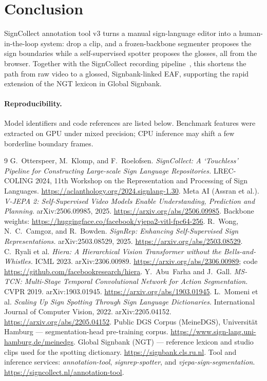 \documentclass[11pt]{article}
\begin{document}
\section{Conclusion}
SignCollect annotation tool v3 turns a manual sign-language editor into a human-in-the-loop
system: drop a clip, and a frozen-backbone segmenter proposes the sign boundaries while a
self-supervised spotter proposes the glosses, all from the browser. Together with the SignCollect
recording pipeline~\cite{signcollect}, this shortens the path from raw video to a glossed,
Signbank-linked EAF, supporting the rapid extension of the NGT lexicon in Global Signbank.

\paragraph{Reproducibility.} Model identifiers and code references are listed below. Benchmark
features were extracted on GPU under mixed precision; CPU inference may shift a few borderline
boundary frames.

\begin{thebibliography}{9}
 G.~Otterspeer, M.~Klomp, and F.~Roelofsen.
  \emph{SignCollect: A `Touchless' Pipeline for Constructing Large-scale Sign Language
  Repositories.} LREC-COLING 2024, 11th Workshop on the Representation and Processing of Sign
  Languages. \url{https://aclanthology.org/2024.signlang-1.30}.
 Meta AI (Assran et al.). \emph{V-JEPA 2: Self-Supervised Video Models Enable
  Understanding, Prediction and Planning.} arXiv:2506.09985, 2025.
  \url{https://arxiv.org/abs/2506.09985}. Backbone weights:
  \url{https://huggingface.co/facebook/vjepa2-vitl-fpc64-256}.
 R.~Wong, N.~C.~Camgoz, and R.~Bowden. \emph{SignRep: Enhancing Self-Supervised
  Sign Representations.} arXiv:2503.08529, 2025. \url{https://arxiv.org/abs/2503.08529}.
 C.~Ryali et al. \emph{Hiera: A Hierarchical Vision Transformer without the
  Bells-and-Whistles.} ICML 2023. arXiv:2306.00989. \url{https://arxiv.org/abs/2306.00989};
  code \url{https://github.com/facebookresearch/hiera}.
 Y.~Abu~Farha and J.~Gall. \emph{MS-TCN: Multi-Stage Temporal Convolutional
  Network for Action Segmentation.} CVPR 2019. arXiv:1903.01945.
  \url{https://arxiv.org/abs/1903.01945}.
 L.~Momeni et al. \emph{Scaling Up Sign Spotting Through Sign Language
  Dictionaries.} International Journal of Computer Vision, 2022. arXiv:2205.04152.
  \url{https://arxiv.org/abs/2205.04152}.
 Public DGS Corpus (MeineDGS), Universit\"at Hamburg --- segmentation-head
  pre-training corpus. \url{https://www.sign-lang.uni-hamburg.de/meinedgs}.
 Global Signbank (NGT) --- reference lexicon and studio clips used for the
  spotting dictionary. \url{https://signbank.cls.ru.nl}.
 Tool and inference services: \emph{annotation-tool}, \emph{signrep-spotter}, and
  \emph{vjepa-sign-segmentation}. \url{https://signcollect.nl/annotation-tool}.
\end{thebibliography}
\end{document}
